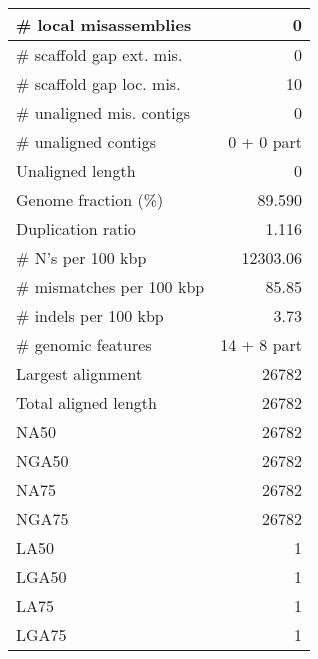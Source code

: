 \documentclass[12pt,a4paper]{article}
\begin{document}
\begin{table}[ht]
\begin{center}
\begin{tabular}{|l*{1}{|r}|}
\# local misassemblies & 0 \\ \hline
\# scaffold gap ext. mis. & 0 \\ \hline
\# scaffold gap loc. mis. & 10 \\ \hline
\# unaligned mis. contigs & 0 \\ \hline
\# unaligned contigs & 0 + 0 part \\ \hline
Unaligned length & 0 \\ \hline
Genome fraction (\%) & 89.590 \\ \hline
Duplication ratio & 1.116 \\ \hline
\# N's per 100 kbp & 12303.06 \\ \hline
\# mismatches per 100 kbp & 85.85 \\ \hline
\# indels per 100 kbp & 3.73 \\ \hline
\# genomic features & 14 + 8 part \\ \hline
Largest alignment & 26782 \\ \hline
Total aligned length & 26782 \\ \hline
NA50 & 26782 \\ \hline
NGA50 & 26782 \\ \hline
NA75 & 26782 \\ \hline
NGA75 & 26782 \\ \hline
LA50 & 1 \\ \hline
LGA50 & 1 \\ \hline
LA75 & 1 \\ \hline
LGA75 & 1 \\ \hline
\end{tabular}
\end{center}
\end{table}
\end{document}
